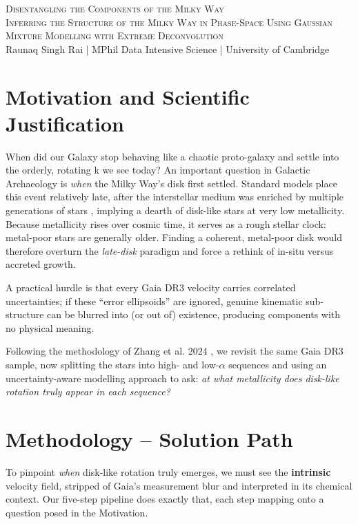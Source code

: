 \documentclass[a4paper,10pt]{article}
\begin{document}
\begin{center}
    {\Large \textsc{Disentangling the Components of the Milky Way}}\\[0.2cm]
    {\textsc{Inferring the Structure of the Milky Way in Phase-Space Using Gaussian Mixture Modelling with Extreme Deconvolution}}\\[0.2cm]
    Raunaq Singh Rai \quad | \quad MPhil Data Intensive Science \quad | \quad University of Cambridge
\end{center}

\begin{multicols}{2}

\section*{Motivation and Scientific Justification}

When did our Galaxy stop behaving like a chaotic proto-galaxy and settle into the orderly,
rotating k we see today?  An important question in Galactic Archaeology is
\emph{when} the Milky Way's disk first settled.  Standard models place this event
relatively late, after the interstellar medium was enriched by multiple generations of
stars \cite{Sestito2020,Gurvich2023}, implying a dearth of disk-like stars at very low
metallicity.  Because metallicity rises over cosmic time, it serves as a rough stellar
clock: metal-poor stars are generally older.  Finding a coherent, metal-poor disk would
therefore overturn the \emph{late-disk} paradigm and force a rethink of in-situ versus
accreted growth.

A practical hurdle is that every Gaia DR3 velocity carries correlated uncertainties; if
these “error ellipsoids” are ignored, genuine kinematic sub-structure can be blurred
into (or out of) existence, producing components with no physical meaning.  

Following the methodology of Zhang et al. 2024 \cite{zhang2024existencemetalpoordiscmilky}, 
we revisit the same Gaia DR3 sample, now splitting the stars into high- and
low-$\alpha$ sequences \cite{Vis2024} and using an uncertainty-aware modelling approach
to ask: \emph{at what metallicity does disk-like rotation truly appear in each
sequence?}


\section*{Methodology – Solution Path}

To pinpoint \emph{when} disk-like rotation truly emerges, we must see the
\textbf{intrinsic} velocity field, stripped of Gaia’s measurement blur and
interpreted in its chemical context.  Our five-step pipeline does exactly that,
each step mapping onto a question posed in the Motivation.


\end{multicols}
\end{document}
